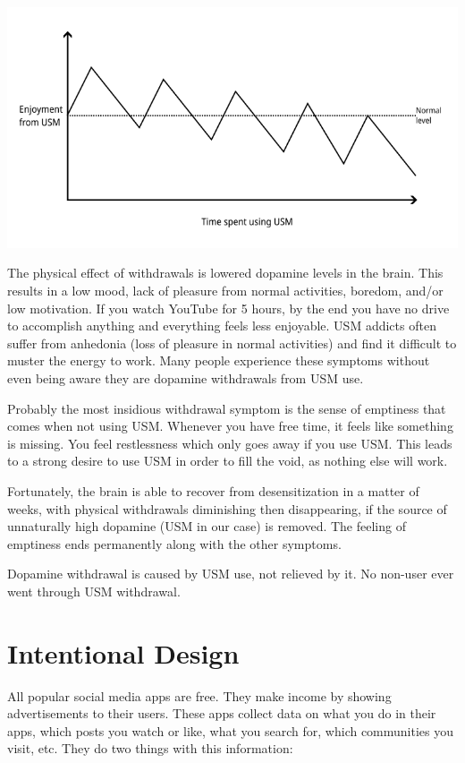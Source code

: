 \documentclass[
  openany]{book}
\newenvironment{rmdnote}{
\color{blue}
\begin{framed}}{\end{framed}}
\begin{document}
\includegraphics[width=0.9\linewidth,height=\textheight,keepaspectratio]{images/dopamine_graph.png}

The physical effect of withdrawals is lowered dopamine levels in the brain. This results in a low mood, lack of pleasure from normal activities, boredom, and/or low motivation. If you watch YouTube for 5 hours, by the end you have no drive to accomplish anything and everything feels less enjoyable. USM addicts often suffer from anhedonia (loss of pleasure in normal activities) and find it difficult to muster the energy to work. Many people experience these symptoms without even being aware they are dopamine withdrawals from USM use.

Probably the most insidious withdrawal symptom is the sense of emptiness that comes when not using USM. Whenever you have free time, it feels like something is missing. You feel restlessness which only goes away if you use USM. This leads to a strong desire to use USM in order to fill the void, as nothing else will work.

Fortunately, the brain is able to recover from desensitization in a matter of weeks, with physical withdrawals diminishing then disappearing, if the source of unnaturally high dopamine (USM in our case) is removed. The feeling of emptiness ends permanently along with the other symptoms.

\begin{rmdnote}
Dopamine withdrawal is caused by USM use, not relieved by it. No non-user ever went through USM withdrawal.

\end{rmdnote}

\section{Intentional Design}\label{intentional-design}

All popular social media apps are free. They make income by showing advertisements to their users. These apps collect data on what you do in their apps, which posts you watch or like, what you search for, which communities you visit, etc. They do two things with this information:
\end{document}
